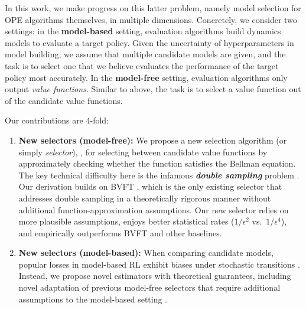 In this work, we make progress on this latter problem, namely model selection for OPE algorithms themselves, in multiple dimensions. %
Concretely, we consider two settings:
%
%
in the \textbf{model-based} setting, evaluation algorithms build dynamics models to evaluate a target policy. Given the uncertainty of hyperparameters in model building, we assume that multiple candidate models are given, and the task is to select one that we believe evaluates the performance of the target policy most accurately. In the \textbf{model-free} setting, 
%
evaluation algorithms only output \textit{value functions}. Similar to above, the task is to select a value function out of the candidate value functions. 
%

Our contributions are 4-fold: \vspace{-.5em}
\begin{enumerate}[leftmargin=*, itemsep=.5pt]
\item \textbf{New selectors (model-free):} We propose a new selection algorithm (or simply \textit{selector}), \lstd, for selecting between candidate value functions by approximately checking whether the function satisfies the Bellman equation. The key technical difficulty here is the infamous \textbf{\textit{double sampling}} problem \cite{baird1995residual, sutton2018reinforcement, chen2019information}. Our derivation builds on BVFT \cite{xie2020batch, zhang2021towards}, which is the only existing selector that addresses double sampling in a theoretically rigorous manner without additional function-approximation assumptions. Our new selector relies on more plausible assumptions, enjoys better statistical rates ($1/\epsilon^2$ vs.~$1/\epsilon^4$), and empirically outperforms BVFT and other baselines.
\item \textbf{New selectors (model-based):} When comparing candidate models, popular losses in model-based RL exhibit biases under stochastic transitions \cite{jiang2024note}. Instead, we propose novel estimators with theoretical guarantees, including novel adaptation of previous model-free selectors that require additional assumptions to the model-based setting \cite{antos2008learning, zitovsky2023revisiting}.  %

\end{enumerate}
